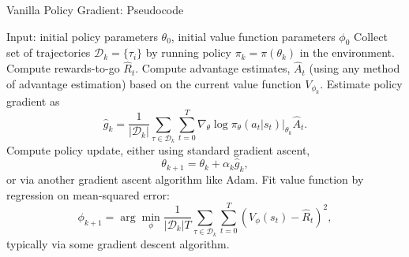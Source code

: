 \documentclass[9pt]{beamer}
\begin{document}
\begin{frame}{Vanilla Policy Gradient: Pseudocode}

    \begin{algorithm}[H]
        \caption{Vanilla Policy Gradient Algorithm}
        \label{alg1}
    \begin{algorithmic}[1]
        \STATE Input: initial policy parameters $\theta_0$, initial value function parameters $\phi_0$
        \STATE Collect set of trajectories ${\mathcal D}_k = \{\tau_i\}$ by running policy $\pi_k = \pi(\theta_k)$ in the environment.
        \STATE Compute rewards-to-go $\hat{R}_t$.
        \STATE Compute advantage estimates, $\hat{A}_t$ (using any method of advantage estimation) based on the current value function $V_{\phi_k}$.
        \STATE Estimate policy gradient as
            \begin{equation*}
            \hat{g}_k = \frac{1}{|{\mathcal D}_k|} \sum_{\tau \in {\mathcal D}_k} \sum_{t=0}^T \left. \nabla_{\theta} \log\pi_{\theta}(a_t|s_t)\right|_{\theta_k} \hat{A}_t.
            \end{equation*}
        \STATE Compute policy update, either using standard gradient ascent,
            \begin{equation*}
            \theta_{k+1} = \theta_k + \alpha_k \hat{g}_k,
            \end{equation*}
            or via another gradient ascent algorithm like Adam.
        \STATE Fit value function by regression on mean-squared error:
            \begin{equation*}
            \phi_{k+1} = \arg \min_{\phi} \frac{1}{|{\mathcal D}_k| T} \sum_{\tau \in {\mathcal D}_k} \sum_{t=0}^T\left( V_{\phi} (s_t) - \hat{R}_t \right)^2,
            \end{equation*}
            typically via some gradient descent algorithm.
        \ENDFOR
    \end{algorithmic}
    \end{algorithm}

\end{frame}
\end{document}
